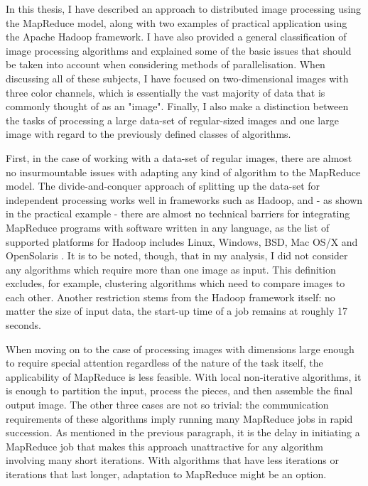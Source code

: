 \documentclass [12pt,a4paper]{report}
\begin{document}
In this thesis, I have described an approach to distributed image processing using the MapReduce model, along with two examples of practical application using the Apache Hadoop framework. I have also provided a general classification of image processing algorithms and explained some of the basic issues that should be taken into account when considering methods of parallelisation. When discussing all of these subjects, I have focused on two-dimensional images with three color channels, which is essentially the vast majority of data that is commonly thought of as an "image". Finally, I also make a distinction between the tasks of processing a large data-set of regular-sized images and one large image with regard to the previously defined classes of algorithms.
 
First, in the case of working with a data-set of regular images, there are almost no insurmountable issues with adapting any kind of algorithm to the MapReduce model. The divide-and-conquer approach of splitting up the data-set for independent processing works well in frameworks such as Hadoop, and - as shown in the practical example - there are almost no technical barriers for integrating MapReduce programs with software written in any language, as the list of supported platforms for Hadoop includes Linux, Windows, BSD, Mac OS/X and OpenSolaris \cite{hadoopfaq}. It is to be noted, though, that in my analysis, I did not consider any algorithms which require more than one image as input. This definition excludes, for example, clustering algorithms which need to compare images to each other. Another restriction stems from the Hadoop framework itself: no matter the size of input data, the start-up time of a job remains at roughly 17 seconds.

When moving on to the case of processing images with dimensions large enough to require special attention regardless of the nature of the task itself, the applicability of MapReduce is less feasible. With local non-iterative algorithms, it is enough to partition the input, process the pieces, and then assemble the final output image. The other three cases are not so trivial: the communication requirements of these algorithms imply running many MapReduce jobs in rapid succession. As mentioned in the previous paragraph, it is the delay in initiating a MapReduce job that makes this approach unattractive for any algorithm involving many short iterations. With algorithms that have less iterations or iterations that last longer, adaptation to MapReduce might be an option.
\end{document}
